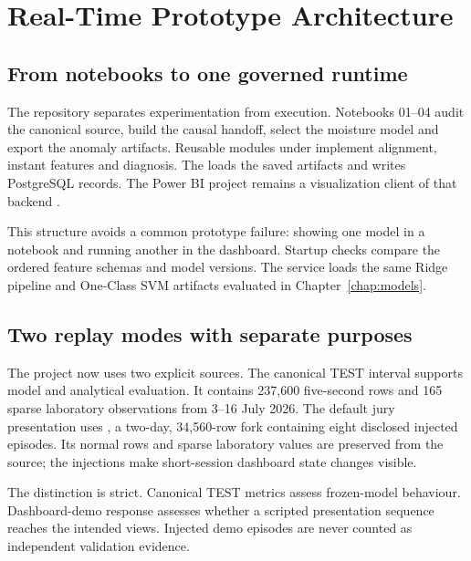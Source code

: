 \chapter{Real-Time Prototype Architecture}
\label{chap:architecture}

\section{From notebooks to one governed runtime}

The repository separates experimentation from execution. Notebooks 01--04 audit the canonical source, build the causal handoff, select the moisture model and export the anomaly artifacts. Reusable modules under  implement alignment, instant features and diagnosis. The  loads the saved artifacts and writes PostgreSQL records. The Power BI project remains a visualization client of that backend \cite{projectrepo}.

This structure avoids a common prototype failure: showing one model in a notebook and running another in the dashboard. Startup checks compare the ordered feature schemas and model versions. The service loads the same Ridge pipeline and One-Class SVM artifacts evaluated in Chapter~\ref{chap:models}.

\section{Two replay modes with separate purposes}

The project now uses two explicit sources. The canonical TEST interval supports model and analytical evaluation. It contains 237,600 five-second rows and 165 sparse laboratory observations from 3--16 July 2026. The default jury presentation uses , a two-day, 34,560-row fork containing eight disclosed injected episodes. Its normal rows and sparse laboratory values are preserved from the source; the injections make short-session dashboard state changes visible.

The distinction is strict. Canonical TEST metrics assess frozen-model behaviour. Dashboard-demo response assesses whether a scripted presentation sequence reaches the intended views. Injected demo episodes are never counted as independent validation evidence.


